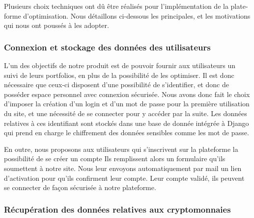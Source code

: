 \documentclass[a4paper, 10pt]{article}
\begin{document}
Plusieurs choix techniques ont dû être réalisés pour l'implémentation de la plate-forme d'optimisation. Nous détaillons ci-dessous les principales, et les motivations qui nous ont poussés à les adopter.

\subsubsection{Connexion et stockage des données des utilisateurs}
\label{sec:developpement_choix_stockage}

L'un des objectifs de notre produit est de pouvoir fournir aux utilisateurs un suivi de leurs portfolios, en plus de la possibilité de les optimiser. Il est donc nécessaire que ceux-ci disposent d'une possibilité de s'identifier, et donc de posséder espace personnel avec connexion sécurisée. Nous avons donc fait le choix d'imposer la création d'un login et d'un mot de passe pour la première utilisation du site, et une nécessité de se connecter pour y accéder par la suite. Les données relatives à ces identifiant sont stockés dans une base de donnée intégrée à Django qui prend en charge le chiffrement des données sensibles comme les mot de passe.

En outre, nous proposons aux utilisateurs qui s’inscrivent sur la plateforme la possibilité de se créer un compte Ils remplissent alors un formulaire qu’ils soumettent à notre site. Nous leur envoyons automatiquement par mail un lien d’activation pour qu’ils confirment leur compte. Leur compte validé, ils peuvent se connecter de façon sécurisée à notre plateforme.

\subsubsection{Récupération des données relatives aux cryptomonnaies}
\label{sec:developpement_choix_data}
\end{document}
